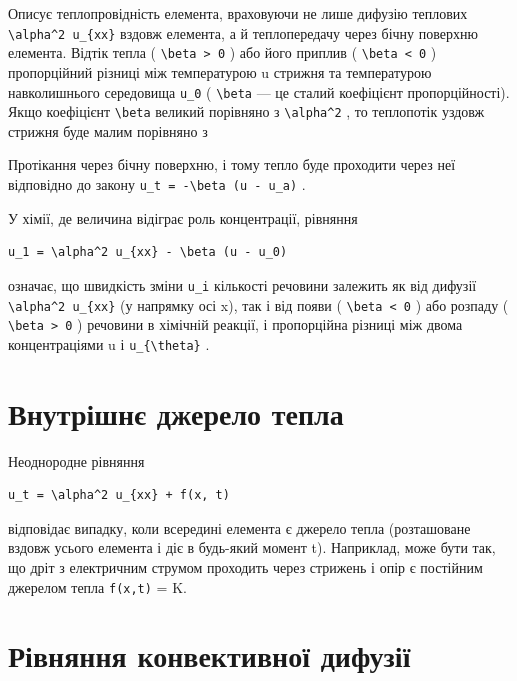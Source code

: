 \documentclass[
  ukrainian,
]{article}
\begin{document}
Описує теплопровідність елемента, враховуючи не лише дифузію теплових
\texttt{\textbackslash{}alpha\^{}2\ u\_\{xx\}} вздовж елемента, а й
теплопередачу через бічну поверхню елемента. Відтік тепла (
\texttt{\textbackslash{}beta\ \textgreater{}\ 0} ) або його приплив (
\texttt{\textbackslash{}beta\ \textless{}\ 0} ) пропорційний різниці між
температурою u стрижня та температурою навколишнього середовища
\texttt{u\_0} ( \texttt{\textbackslash{}beta} --- це сталий коефіцієнт
пропорційності). Якщо коефіцієнт \texttt{\textbackslash{}beta} великий
порівняно з \texttt{\textbackslash{}alpha\^{}2} , то теплопотік уздовж
стрижня буде малим порівняно з

Протікання через бічну поверхню, і тому тепло буде проходити через неї
відповідно до закону
\texttt{u\_t\ =\ -\textbackslash{}beta\ (u\ -\ u\_a)} .

У хімії, де величина відіграє роль концентрації, рівняння

\begin{verbatim}
u_1 = \alpha^2 u_{xx} - \beta (u - u_0)
\end{verbatim}

означає, що швидкість зміни \texttt{u\_i} кількості речовини залежить як
від дифузії \texttt{\textbackslash{}alpha\^{}2\ u\_\{xx\}} (у напрямку
осі x), так і від появи ( \texttt{\textbackslash{}beta\ \textless{}\ 0}
) або розпаду ( \texttt{\textbackslash{}beta\ \textgreater{}\ 0} )
речовини в хімічній реакції, і пропорційна різниці між двома
концентраціями u і \texttt{u\_\{\textbackslash{}theta\}} .

\section{Внутрішнє джерело
тепла}\label{ux432ux43dux443ux442ux440ux456ux448ux43dux454-ux434ux436ux435ux440ux435ux43bux43e-ux442ux435ux43fux43bux430}

Неоднородне рівняння

\begin{verbatim}
u_t = \alpha^2 u_{xx} + f(x, t)
\end{verbatim}

відповідає випадку, коли всередині елемента є джерело тепла (розташоване
вздовж усього елемента і діє в будь-який момент t). Наприклад, може бути
так, що дріт з електричним струмом проходить через стрижень і опір є
постійним джерелом тепла \texttt{f(x,t)} = K.

\section{Рівняння конвективної
дифузії}\label{ux440ux456ux432ux43dux44fux43dux43dux44f-ux43aux43eux43dux432ux435ux43aux442ux438ux432ux43dux43eux457-ux434ux438ux444ux443ux437ux456ux457}
\end{document}
